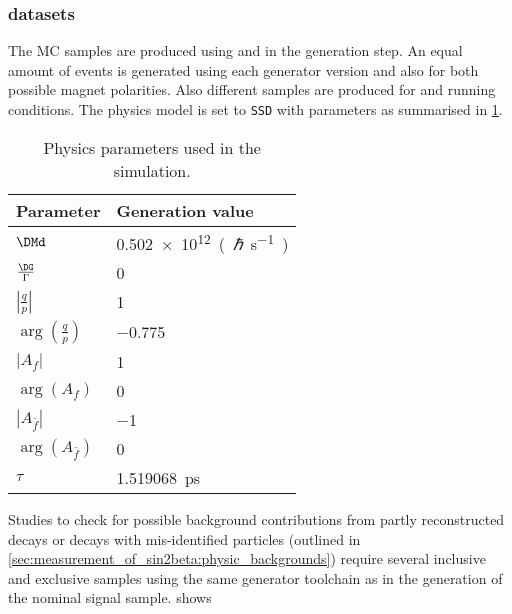 \subsubsection{\MC datasets}
\label{sec:measurement_of_sin2beta:data_preparation:datasamples:mc}

The \acf{MC} samples are produced using \PythiaSix and \PythiaEight in the
generation step. An equal amount of events is generated using each generator
version and also for both possible magnet polarities. Also different samples are
produced for \catOO and \catOT running conditions. The \EvtGen physics model is
set to \texttt{SSD} with parameters as summarised in
\cref{tab:measurement_of_sin2beta:data_preparation:datasamples:mc:decfile}.
%
\begin{table}
\centering
\caption{Physics parameters used in the simulation.}
\label{tab:measurement_of_sin2beta:data_preparation:datasamples:mc:decfile}
\begin{tabular}{ll}
\toprule
Parameter                            & Generation value \\
\midrule
$\DMd$                               & \SI{0.502e12}{(\planckbar\per\second)} \\
$\frac{\DG}{\Gamma}$                 & \num{0} \\
$\left\vert\frac{q}{p}\right\vert$   & \num{1} \\
$\arg(\frac{q}{p})$                  & \num{-0.775} \\
$\vert A_f \vert$                    & \num{1} \\
$\arg(A_f)$                          & \num{0} \\
$\left\vert A_{\bar{f}} \right\vert$ & \num{-1}  \\
$\arg(A_{\bar{f}})$                  & \num{0} \\
$\tau$                               & \SI{1.519068}{\pico\second}\\
\bottomrule
\end{tabular}
\end{table}
%
Studies to check for possible background contributions from partly reconstructed
decays or decays with mis-identified particles (outlined in
\cref{sec:measurement_of_sin2beta:physic_backgrounds}) require several inclusive
and exclusive \MC samples using the same generator toolchain as in the
generation of the nominal signal \MC sample.
 shows
